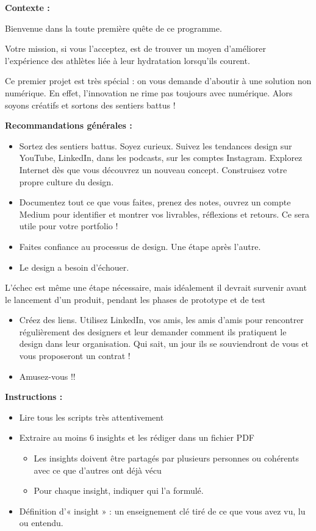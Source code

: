 \makeheaderfiles

\textbf{Contexte :}

Bienvenue dans la toute première quête de ce programme.

Votre mission, si vous l'acceptez, est de trouver un moyen d'améliorer l'expérience des athlètes liée à leur hydratation lorsqu'ils courent.

Ce premier projet est très spécial : on vous demande d'aboutir à une solution non numérique. En effet, l'innovation ne rime pas toujours avec numérique. Alors soyons créatifs et sortons des sentiers battus !

\textbf{Recommandations générales :}

\begin{itemize}
\item Sortez des sentiers battus. Soyez curieux. Suivez les tendances design sur YouTube, LinkedIn, dans les podcasts, sur les comptes Instagram. Explorez Internet dès que vous découvrez un nouveau concept. Construisez votre propre culture du design.
\item Documentez tout ce que vous faites, prenez des notes, ouvrez un compte Medium pour identifier et montrer vos livrables, réflexions et retours. Ce sera utile pour votre portfolio !
\item Faites confiance au processus de design. Une étape après l'autre.
\item Le design a besoin d'échouer.
\end{itemize}
L'échec est même une étape nécessaire, mais idéalement il devrait survenir avant le lancement d'un produit, pendant les phases de prototype et de test
\begin{itemize}
\item Créez des liens. Utilisez LinkedIn, vos amis, les amis d'amis pour rencontrer régulièrement des designers et leur demander comment ils pratiquent le design dans leur organisation. Qui sait, un jour ils se souviendront de vous et vous proposeront un contrat !
\item Amusez-vous !!
\end{itemize}

\textbf{Instructions :}

\begin{itemize}
\item Lire tous les scripts très attentivement
\item Extraire au moins 6 insights et les rédiger dans un fichier PDF
\begin{itemize}
\item Les insights doivent être partagés par plusieurs personnes ou cohérents avec ce que d'autres ont déjà vécu
\item Pour chaque insight, indiquer qui l'a formulé.
\end{itemize}
\item Définition d'« insight » : un enseignement clé tiré de ce que vous avez vu, lu ou entendu.
\end{itemize}

